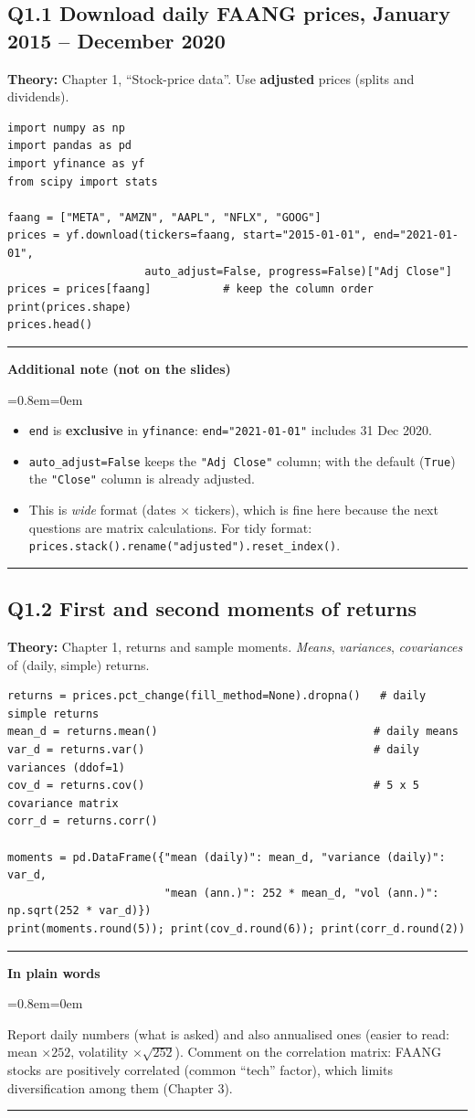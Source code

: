 \documentclass[11pt,a4paper]{report}
\newenvironment{notebox}[1]
  {\par\medskip\Needspace{6\baselineskip}\noindent\rule{\linewidth}{0.4pt}\par\nopagebreak
   \noindent\textbf{#1}\par\nopagebreak
   \begin{list}{}{\leftmargin=0.8em\rightmargin=0em\topsep=2pt}\item[]}
  {\end{list}\nopagebreak\noindent\rule{\linewidth}{0.4pt}\par\medskip}
\newenvironment{plainbox}{\begin{notebox}{In plain words}}{\end{notebox}}
\newenvironment{addnote}{\begin{notebox}{Additional note (not on the slides)}}{\end{notebox}}
\begin{document}
\subsection*{Q1.1 Download daily FAANG prices, January 2015 -- December 2020}
\textbf{Theory:} Chapter 1, ``Stock-price data''. Use \textbf{adjusted} prices
(splits and dividends).
\begin{lstlisting}
import numpy as np
import pandas as pd
import yfinance as yf
from scipy import stats

faang = ["META", "AMZN", "AAPL", "NFLX", "GOOG"]
prices = yf.download(tickers=faang, start="2015-01-01", end="2021-01-01",
                     auto_adjust=False, progress=False)["Adj Close"]
prices = prices[faang]           # keep the column order
print(prices.shape)
prices.head()
\end{lstlisting}
\begin{addnote}
\begin{itemize}
  \item \texttt{end} is \textbf{exclusive} in \texttt{yfinance}: \texttt{end="2021-01-01"} includes 31 Dec 2020.
  \item \texttt{auto\_adjust=False} keeps the \texttt{"Adj Close"} column; with the
    default (\texttt{True}) the \texttt{"Close"} column is already adjusted.
  \item This is \emph{wide} format (dates $\times$ tickers), which is fine here because
    the next questions are matrix calculations. For tidy format:
    \texttt{prices.stack().rename("adjusted").reset\_index()}.
\end{itemize}
\end{addnote}

\subsection*{Q1.2 First and second moments of returns}
\textbf{Theory:} Chapter 1, returns and sample moments. \emph{Means},
\emph{variances}, \emph{covariances} of (daily, simple) returns.
\begin{lstlisting}
returns = prices.pct_change(fill_method=None).dropna()   # daily simple returns
mean_d = returns.mean()                                 # daily means
var_d = returns.var()                                   # daily variances (ddof=1)
cov_d = returns.cov()                                   # 5 x 5 covariance matrix
corr_d = returns.corr()

moments = pd.DataFrame({"mean (daily)": mean_d, "variance (daily)": var_d,
                        "mean (ann.)": 252 * mean_d, "vol (ann.)": np.sqrt(252 * var_d)})
print(moments.round(5)); print(cov_d.round(6)); print(corr_d.round(2))
\end{lstlisting}
\begin{plainbox}
Report daily numbers (what is asked) and also annualised ones (easier to read:
mean $\times252$, volatility $\times\sqrt{252}$). Comment on the correlation matrix:
FAANG stocks are positively correlated (common ``tech'' factor), which limits
diversification among them (Chapter 3).
\end{plainbox}
\end{document}
